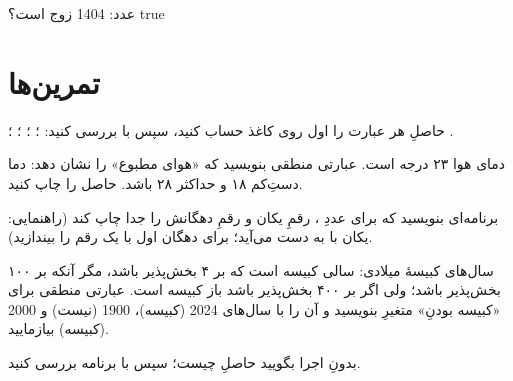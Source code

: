 \begin{progoutfa}
عدد: 1404
زوج است؟ true
\end{progoutfa}

\section{تمرین‌ها}

\exercise حاصلِ هر عبارت را اول روی کاغذ حساب کنید، سپس با 
بررسی کنید: ؛ ؛ ؛
؛ .

\exercise دمای هوا ۲۳ درجه است. عبارتی منطقی بنویسید که «هوای مطبوع» را
نشان دهد: دما دستِ‌کم ۱۸ و حداکثر ۲۸ باشد. حاصل را چاپ کنید.

\exercise برنامه‌ای بنویسید که برای عددِ ، رقمِ یکان و رقمِ
دهگانش را جدا چاپ کند (راهنمایی: یکان با  به دست می‌آید؛ برای
دهگان اول با  یک رقم را بیندازید).

\exercise سال‌های کبیسهٔ میلادی: سالی کبیسه است که بر ۴ بخش‌پذیر باشد،
مگر آنکه بر ۱۰۰ بخش‌پذیر باشد؛ ولی اگر بر ۴۰۰ بخش‌پذیر باشد باز کبیسه
است. عبارتی منطقی برای «کبیسه بودنِ» متغیرِ  بنویسید و آن را با
سال‌های 2024 (کبیسه)، 1900 (نیست) و 2000 (کبیسه) بیازمایید.

\exercise بدونِ اجرا بگویید حاصلِ  چیست؛
سپس با برنامه بررسی کنید.
